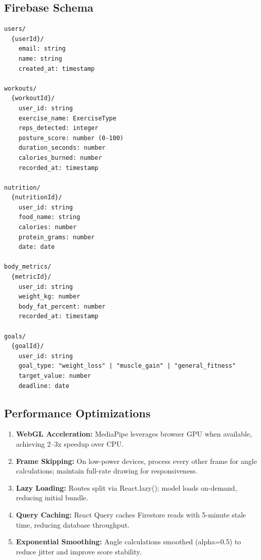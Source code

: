 \documentclass[12pt,a4paper]{article}
\begin{document}
\subsection{Firebase Schema}

\begin{lstlisting}[caption={Firestore collection structure}]
users/
  {userId}/
    email: string
    name: string
    created_at: timestamp

workouts/
  {workoutId}/
    user_id: string
    exercise_name: ExerciseType
    reps_detected: integer
    posture_score: number (0-100)
    duration_seconds: number
    calories_burned: number
    recorded_at: timestamp

nutrition/
  {nutritionId}/
    user_id: string
    food_name: string
    calories: number
    protein_grams: number
    date: date

body_metrics/
  {metricId}/
    user_id: string
    weight_kg: number
    body_fat_percent: number
    recorded_at: timestamp

goals/
  {goalId}/
    user_id: string
    goal_type: "weight_loss" | "muscle_gain" | "general_fitness"
    target_value: number
    deadline: date
\end{lstlisting}

\subsection{Performance Optimizations}

\begin{enumerate}[noitemsep, topsep=2pt]
  \item \textbf{WebGL Acceleration:} MediaPipe leverages browser GPU when 
        available, achieving 2--3x speedup over CPU.
  
  \item \textbf{Frame Skipping:} On low-power devices, process every other frame 
        for angle calculations; maintain full-rate drawing for responsiveness.
  
  \item \textbf{Lazy Loading:} Routes split via React.lazy(); model loads 
        on-demand, reducing initial bundle.
  
  \item \textbf{Query Caching:} React Query caches Firestore reads with 5-minute 
        stale time, reducing database throughput.
  
  \item \textbf{Exponential Smoothing:} Angle calculations smoothed (alpha=0.5) 
        to reduce jitter and improve score stability.
\end{enumerate}
\end{document}
